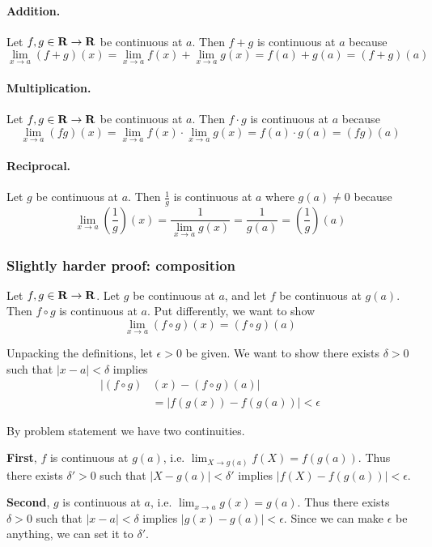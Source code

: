 \paragraph{Addition.} Let $f,g\in\mathbf{R}\to\mathbf{R}$ be continuous at $a$. Then
$f+g$ is continuous at $a$ because
\[\lim_{x\to a}(f+g)(x)=\lim_{x\to a}f(x)+\lim_{x\to a}g(x)=f(a)+g(a)=(f+g)(a)\]

\paragraph{Multiplication.} Let $f,g\in\mathbf{R}\to\mathbf{R}$ be continuous at $a$. Then
$f\cdot g$ is continuous at $a$ because
\[\lim_{x\to a}(fg)(x)=\lim_{x\to a}f(x)\cdot\lim_{x\to a}g(x)=f(a)\cdot g(a)=(fg)(a)\]

\paragraph{Reciprocal.} Let $g$ be continuous at $a$. Then $\frac{1}{g}$
is continuous at $a$ where $g(a)\neq 0$ because
\[\lim_{x\to a}\left(\frac{1}{g}\right)(x)=\frac{1}{\lim_{x\to a}g(x)}=\frac{1}{g(a)}=\left(\frac{1}{g}\right)(a)\]

\subsubsection*{Slightly harder proof: composition}

Let $f,g\in\mathbf{R}\to\mathbf{R}$. Let $g$ be continuous at $a$, and let $f$ be
continuous at $g(a)$. Then $f\circ g$ is continuous at $a$. Put
differently, we want to show
\[\lim_{x\to a}(f\circ g)(x)=(f\circ g)(a)\]

Unpacking the definitions, let $\epsilon>0$ be given. We want to show there
exists $\delta>0$ such that $|x-a|<\delta$ implies
\begin{align*}
    |(f\circ g)&(x)-(f\circ g)(a)|\\
    &=|f(g(x))-f(g(a))|<\epsilon
\end{align*}

By problem statement we have two continuities.

\vs

\textbf{First}, $f$ is continuous at $g(a)$, i.e.
$\lim_{X\to g(a)}f(X)=f(g(a))$. Thus there exists $\delta'>0$ such that
$|X-g(a)|<\delta'$ implies $|f(X)-f(g(a))|<\epsilon$.

\vs

\textbf{Second}, $g$ is continuous at $a$, i.e.
$\lim_{x\to a}g(x)=g(a)$. Thus there exists $\delta>0$ such that
$|x-a|<\delta$ implies $|g(x)-g(a)|<\epsilon$. Since we can make
$\epsilon$ be anything, we can set it to $\delta'$.

